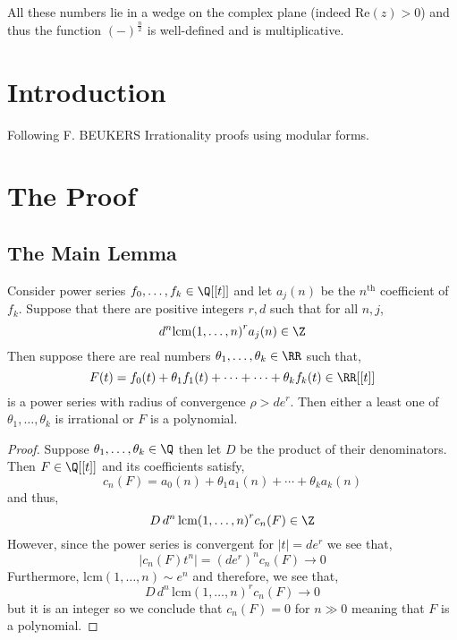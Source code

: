 \documentclass[12pt]{article}
\begin{document}
\begin{rmk}
All these numbers lie in a wedge on the complex plane (indeed $\mathrm{Re}(z) > 0$) and thus the function $(-)^{\frac{n}{2}}$ is well-defined and is multiplicative. 
\end{rmk}


\section{Introduction}

\begin{rmk}
Following F. BEUKERS
Irrationality proofs using modular forms.
\end{rmk}

\section{The Proof}

\subsection{The Main Lemma}

\newcommand{\lcm}{\mathrm{lcm}}

\begin{lemma}
Consider power series $f_0, \dots, f_k \in \Q[[t]]$ and let $a_j(n)$ be the $n^{\text{th}}$ coefficient of $f_k$. Suppose that there are positive integers $r, d$ such that for all $n, j$,
\[ d^n \lcm{(1, \dots, n)}^r a_j(n) \in \Z \]
Then suppose there are real numbers $\theta_1, \dots, \theta_k \in \RR$ such that,
\[ F(t) = f_0(t) + \theta_1 f_1(t) + \cdots + \cdots + \theta_k f_k(t) \in \RR[[t]] \]
is a power series with radius of convergence $\rho > d e^r$. Then either a least one of $\theta_1, \dots, \theta_k$ is irrational or $F$ is a polynomial.
\end{lemma}

\begin{proof}
Suppose $\theta_1, \dots, \theta_k \in \Q$ then let $D$ be the product of their denominators. Then $F \in \Q[[t]]$ and its coefficients satisfy,
\[ c_n(F) = a_0(n) + \theta_1 a_1(n) + \cdots + \theta_k a_k(n) \]
and thus,
\[ D \, d^n \, \lcm{(1, \dots, n)}^r c_n(F) \in \Z \]
However, since the power series is convergent for $|t| = d e^r$ we see that,
\[ |c_n(F) t^n| = (d e^r)^n c_n(F) \to 0 \]
Furthermore, $\lcm{(1, \dots, n)} \sim e^n$ and therefore, we see that,
\[ D \, d^n \, \lcm{(1, \dots, n)}^r c_n(F) \to 0 \]
but it is an integer so we conclude that $c_n(F) = 0$ for $n \gg 0$ meaning that $F$ is a polynomial.
\end{proof}
\end{document}
